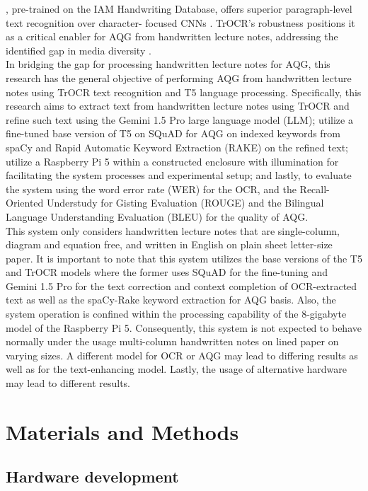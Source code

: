 \documentclass[conference]{IEEEtran}
\begin{document}
\cite{Li2021}, pre-trained on the IAM Handwriting Database, offers superior paragraph-level text recognition over character-
focused CNNs \cite{Mortadi2023}. TrOCR’s robustness positions it as a critical enabler for AQG from handwritten lecture notes, addressing the identified gap in media diversity \cite{Arbaaeen2020}. 
\\
\indent In bridging the gap for processing handwritten lecture notes for AQG, this research has the 
general objective of performing AQG from handwritten lecture
notes using TrOCR text recognition and T5 language processing.
Specifically, this research aims to extract text from
handwritten lecture notes using TrOCR and refine such text 
using the Gemini 1.5 Pro large language model (LLM); utilize 
a fine-tuned base version of T5 on SQuAD for AQG on 
indexed keywords from spaCy and Rapid Automatic Keyword 
Extraction (RAKE) on the refined text; utilize a Raspberry 
Pi 5 within a constructed enclosure with illumination 
for facilitating the system processes and experimental setup;
and lastly, to evaluate the system using the word error 
rate (WER) for the OCR, and the Recall-Oriented Understudy for 
Gisting Evaluation (ROUGE) and the Bilingual Language Understanding 
Evaluation (BLEU) for the quality of AQG.
\\
\indent This system only considers handwritten lecture notes 
that are single-column, diagram and equation free, and written 
in English on plain sheet letter-size paper. It is important to note that 
this system utilizes the base versions of the T5 and TrOCR models where the 
former uses SQuAD for the fine-tuning and Gemini 1.5 Pro for the 
text correction and context completion of OCR-extracted text as well as 
the spaCy-Rake keyword extraction for AQG basis. Also, the system operation is confined 
within the processing capability of the 8-gigabyte model of the Raspberry Pi 5.
Consequently, this system is not expected to behave normally under the usage
multi-column handwritten notes on lined paper on varying sizes. 
A different model for OCR or AQG may lead to differing results as well as 
for the text-enhancing model. Lastly, the usage of alternative hardware 
may lead to different results.
\section{Materials and Methods}
\subsection{Hardware development} 
\end{document}
